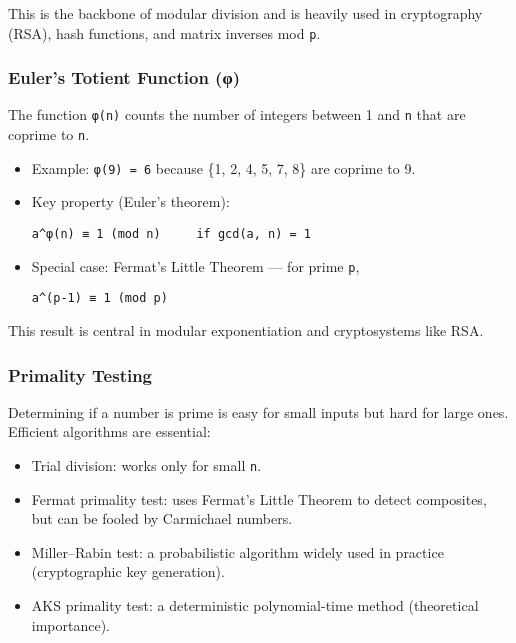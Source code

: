 \documentclass[
  letterpaper,
  DIV=11,
  numbers=noendperiod]{scrreprt}
\providecommand{\tightlist}{%
  \setlength{\itemsep}{0pt}\setlength{\parskip}{0pt}}
\begin{document}
This is the backbone of modular division and is heavily used in
cryptography (RSA), hash functions, and matrix inverses mod \texttt{p}.

\subsubsection{Euler's Totient Function
(φ)}\label{eulers-totient-function-ux3c6}

The function \texttt{φ(n)} counts the number of integers between 1 and
\texttt{n} that are coprime to \texttt{n}.

\begin{itemize}
\item
  Example: \texttt{φ(9)\ =\ 6} because \{1, 2, 4, 5, 7, 8\} are coprime
  to 9.
\item
  Key property (Euler's theorem):

\begin{verbatim}
a^φ(n) ≡ 1 (mod n)     if gcd(a, n) = 1
\end{verbatim}
\item
  Special case: Fermat's Little Theorem --- for prime \texttt{p},

\begin{verbatim}
a^(p-1) ≡ 1 (mod p)
\end{verbatim}
\end{itemize}

This result is central in modular exponentiation and cryptosystems like
RSA.

\subsubsection{Primality Testing}\label{primality-testing}

Determining if a number is prime is easy for small inputs but hard for
large ones. Efficient algorithms are essential:

\begin{itemize}
\tightlist
\item
  Trial division: works only for small \texttt{n}.
\item
  Fermat primality test: uses Fermat's Little Theorem to detect
  composites, but can be fooled by Carmichael numbers.
\item
  Miller--Rabin test: a probabilistic algorithm widely used in practice
  (cryptographic key generation).
\item
  AKS primality test: a deterministic polynomial-time method
  (theoretical importance).
\end{itemize}
\end{document}
